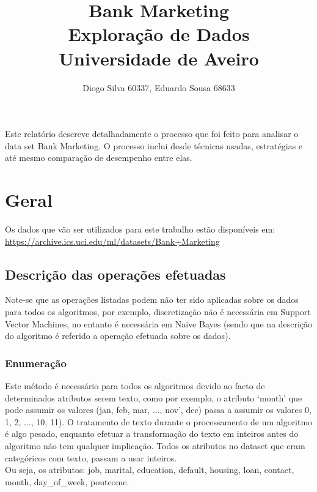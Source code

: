 \documentclass[portugues,final]{revdetua}
\begin{document}

\title{\textbf{Bank Marketing}\\ Exploração de Dados \\Universidade de Aveiro}
\author{Diogo Silva 60337, Eduardo Sousa 68633}
\maketitle
\begin{resumo} %
Este relatório descreve detalhadamente o processo que foi feito para analisar o data set Bank Marketing.
O processo inclui desde técnicas usadas, estratégias e até mesmo comparação de desempenho entre elas.
\end{resumo}

\section{Geral}

Os dados que vão ser utilizados para este trabalho estão disponíveis em:
\url{https://archive.ics.uci.edu/ml/datasets/Bank+Marketing}

\subsection{Descrição das operações efetuadas}

Note-se que as operações listadas podem não ter sido aplicadas sobre os dados para todos os algoritmos, por exemplo, discretização não é necessária em Support Vector Machines, no entanto é necessária em Naive Bayes (sendo que na descrição do algoritmo é referido a operação efetuada sobre os dados).

\subsubsection{Enumeração}
Este método é necessário para todos os algoritmos devido ao facto de determinados atributos serem texto, como por exemplo, o atributo ‘month’ que pode assumir os valores (jan, feb, mar, ..., nov', dec) passa a assumir os valores 0, 1, 2, ..., 10, 11). O tratamento de texto durante o processamento de um algoritmo é algo pesado, enquanto efetuar a transformação do texto em inteiros antes do algoritmo não tem qualquer implicação.
Todos os atributos no dataset que eram categóricos com texto, passam a usar inteiros.\\
Ou seja, os atributos: job, marital, education, default, housing, loan, contact, month, day\_of\_week, poutcome.
\end{document}
